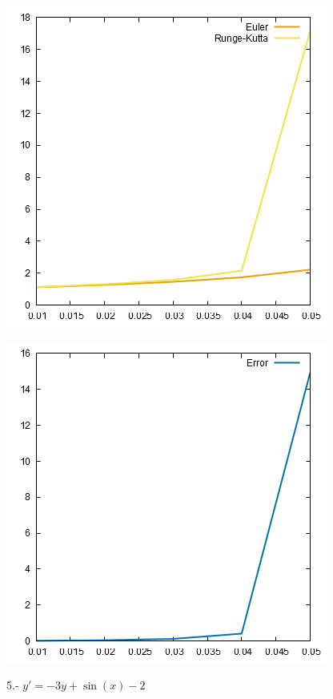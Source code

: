 \documentclass[10pt]{article}
\begin{document}
\begin{multicols}{2}
\begin{center}
				\includegraphics[scale=0.4]{../Graficas/4.png}
			\end{center}
			\begin{center}
				\includegraphics[scale=0.4]{../Graficas/4_1.png}
			\end{center}
			5.- $y'=-3y+\sin(x)-2$
			\begin{center}

\end{center}
\end{multicols}
\end{document}
